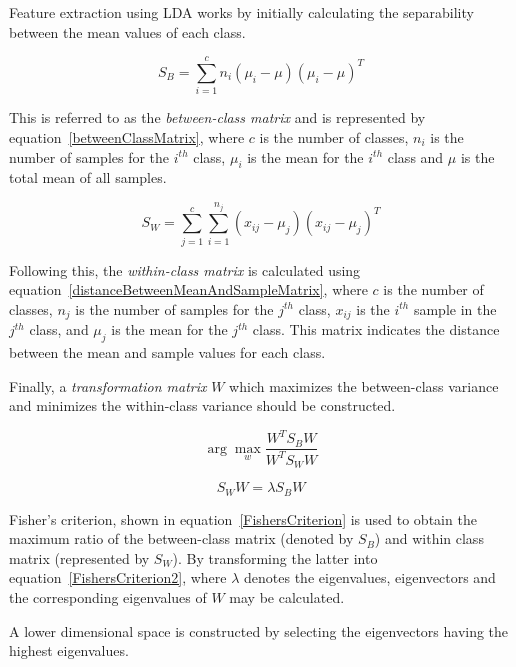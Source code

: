 Feature extraction using LDA \citep{Sharma2015,Huang2002} works by initially calculating the separability between the mean values of each class.

\begin{equation}
	\label{betweenClassMatrix}
	S_B = \sum^{c}_{i=1}n_{i}(\mu_i - \mu)(\mu_i - \mu)^T
	\end{equation}

This is referred to as the \textit{between-class matrix} and is represented by equation~\ref{betweenClassMatrix}, where $c$ is the number of classes, $n_i$ is the number of samples for the $i^{th}$ class, $\mu_i$ is the mean for the $i^{th}$ class and $\mu$ is the total mean of all samples.

\begin{equation}
	\label{distanceBetweenMeanAndSampleMatrix}
	S_W = \sum^{c}_{j=1}\sum^{n_j}_{i=1}(x_{ij} - \mu_j)(x_{ij} - \mu_j)^T
	\end{equation}

Following this, the \textit{within-class matrix} is calculated using equation~\ref{distanceBetweenMeanAndSampleMatrix}, where $c$ is the number of classes, $n_j$ is the number of samples for the $j^{th}$ class, $x_{ij}$ is the $i^{th}$ sample in the $j^{th}$ class, and $\mu_j$ is the mean for the $j^{th}$ class. This matrix indicates the distance between the mean and sample values for each class.

Finally, a \textit{transformation matrix} $W$ which maximizes the between-class variance and minimizes the within-class variance should be constructed.

\begin{equation}
	\label{FishersCriterion}
	\arg\max_{w} \frac{W^T S_B W}{W^T S_W W}
	\end{equation}

\begin{equation}
	\label{FishersCriterion2}
	S_W W = \lambda S_B W
	\end{equation}

Fisher's criterion, shown in equation~\ref{FishersCriterion} is used to obtain the maximum ratio of the between-class matrix (denoted by $S_B$) and within class matrix (represented by $S_W$). 
By transforming the latter into equation~\ref{FishersCriterion2}, where $\lambda$ denotes the eigenvalues, eigenvectors and the corresponding eigenvalues of $W$ may be calculated.

A lower dimensional space is constructed by selecting the eigenvectors having the highest eigenvalues. 

